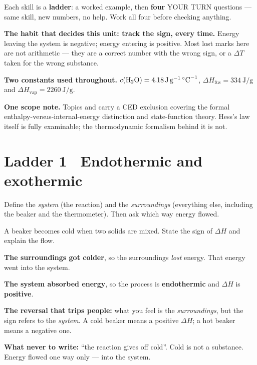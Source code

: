 \documentclass{apchem-worksheet}
\begin{document}
\apctitleblock

\begin{apcnote}
Each skill is a \textbf{ladder}: a worked example, then \textbf{four}
YOUR TURN questions --- same skill, new numbers, no help. Work all four
before checking anything.

\textbf{The habit that decides this unit: track the sign, every time.}
Energy leaving the system is negative; energy entering is positive. Most
lost marks here are not arithmetic --- they are a correct number with the
wrong sign, or a $\Delta T$ taken for the wrong substance.

\textbf{Two constants used throughout.}
$c(\ce{H2O}) = \SI{4.18}{\joule\per\gram\per\celsius}$,
$\Delta H_{\text{fus}} = \SI{334}{\joule\per\gram}$ and
$\Delta H_{\text{vap}} = \SI{2260}{\joule\per\gram}$.

\textbf{One scope note.} Topics  and  carry a CED
exclusion covering the formal enthalpy-versus-internal-energy distinction
and state-function theory. Hess's law itself is fully examinable; the
thermodynamic formalism behind it is not.
\end{apcnote}

\section*{\sffamily Ladder 1 \textbullet\ Endothermic and exothermic}

Define the \emph{system} (the reaction) and the \emph{surroundings}
(everything else, including the beaker and the thermometer). Then ask
which way energy flowed.

\begin{workedexample}
A beaker becomes cold when two solids are mixed. State the sign of
$\Delta H$ and explain the flow.

\textbf{The surroundings got colder}, so the surroundings \emph{lost}
energy. That energy went into the system.

\textbf{The system absorbed energy}, so the process is
\textbf{endothermic} and $\Delta H$ is \textbf{positive}.

\textbf{The reversal that trips people:} what you feel is the
\emph{surroundings}, but the sign refers to the \emph{system}. A cold
beaker means a positive $\Delta H$; a hot beaker means a negative one.

\textbf{What never to write:} ``the reaction gives off cold''. Cold is not
a substance. Energy flowed one way only --- into the system.
\end{workedexample}
\end{document}
